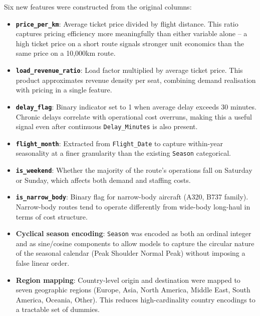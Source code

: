 \documentclass[12pt,a4paper]{article}
\begin{document}
Six new features were constructed from the original columns:

\begin{itemize}[leftmargin=*]
  \item \textbf{\texttt{price\_per\_km}}: Average ticket price divided by flight distance. This ratio captures pricing efficiency more meaningfully than either variable alone -- a high ticket price on a short route signals stronger unit economics than the same price on a 10,000km route.

  \item \textbf{\texttt{load\_revenue\_ratio}}: Load factor multiplied by average ticket price. This product approximates revenue density per seat, combining demand realisation with pricing in a single feature.

  \item \textbf{\texttt{delay\_flag}}: Binary indicator set to 1 when average delay exceeds 30 minutes. Chronic delays correlate with operational cost overruns, making this a useful signal even after continuous \texttt{Delay\_Minutes} is also present.

  \item \textbf{\texttt{flight\_month}}: Extracted from \texttt{Flight\_Date} to capture within-year seasonality at a finer granularity than the existing \texttt{Season} categorical.

  \item \textbf{\texttt{is\_weekend}}: Whether the majority of the route's operations fall on Saturday or Sunday, which affects both demand and staffing costs.

  \item \textbf{\texttt{is\_narrow\_body}}: Binary flag for narrow-body aircraft (A320, B737 family). Narrow-body routes tend to operate differently from wide-body long-haul in terms of cost structure.

  \item \textbf{Cyclical season encoding}: \texttt{Season} was encoded as both an ordinal integer and as sine/cosine components to allow models to capture the circular nature of the seasonal calendar (Peak \textrightarrow{} Shoulder \textrightarrow{} Normal \textrightarrow{} Peak) without imposing a false linear order.

  \item \textbf{Region mapping}: Country-level origin and destination were mapped to seven geographic regions (Europe, Asia, North America, Middle East, South America, Oceania, Other). This reduces high-cardinality country encodings to a tractable set of dummies.
\end{itemize}
\end{document}
